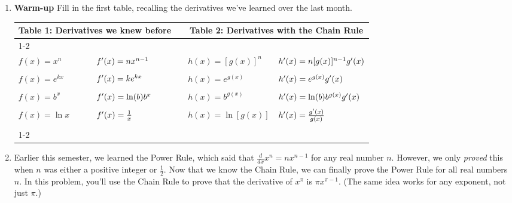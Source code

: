 \documentclass{article}
\begin{document}
\begin{enumerate}
\item 
{\bf Warm-up} Fill in the first table, recalling the derivatives we've learned over the last month.
\begin{center}
    \begin{tabular}{| l | l | c | l | l |}
      \multicolumn{2}{c}{Table 1: Derivatives we knew before} &
      \multicolumn{1}{c}{} 
      & \multicolumn{2}{c}{Table 2: Derivatives with the Chain Rule} \\ 
      \cline{1-2} \cline{4-5} & & & & \\
      $f(x) = x^n$ & $f'(x) = nx^{n-1}$ \hspace{0.4in} &
      \hspace{0.5in} &
      $h(x) = [g(x)]^n$ & $h'(x) = n[g(x)]^{n-1}g'(x)$
      \hspace{0.9in} \\ 
      & & & & \\
      $f(x) = e^{kx}$ & $f'(x) = ke^{kx}$ & & $h(x) = e^{g(x)}$
      & $h'(x) = e^{g(x)}g'(x)$ \\ 
      & & & & \\
      $f(x) = b^{x}$ & $f'(x) = \ln(b)b^x$ & & $h(x) = b^{g(x)}$
      & $h'(x) = \ln(b)b^{g(x)}g'(x)$ \\ 
      & & & & \\
      $f(x) = \ln x$ & $f'(x) = \frac{1}{x}$ & & $h(x) = \ln
      [g(x)]$ & 
      $h'(x) = \frac{g'(x)}{g(x)}$ \\ 
      & & & & \\
      \cline{1-2} \cline{4-5} 
    \end{tabular}
  \end{center}
  


\item 

  Earlier this semester, we learned the Power Rule, which said that $\frac{d}{dx} x^n
  = n x^{n-1}$ for any real number $n$.  However, we only \textit{proved}
  this when $n$ was either a positive integer or $\frac{1}{2}$.  Now that
  we know the Chain Rule, we can finally prove the Power Rule for all real
  numbers $n$.  In this problem, you'll use the Chain Rule to prove that
  the derivative of $x^{\pi}$ is $\pi x^{\pi - 1}$.  (The same idea works
  for any exponent, not just $\pi$.)


\end{enumerate}
\end{document}
